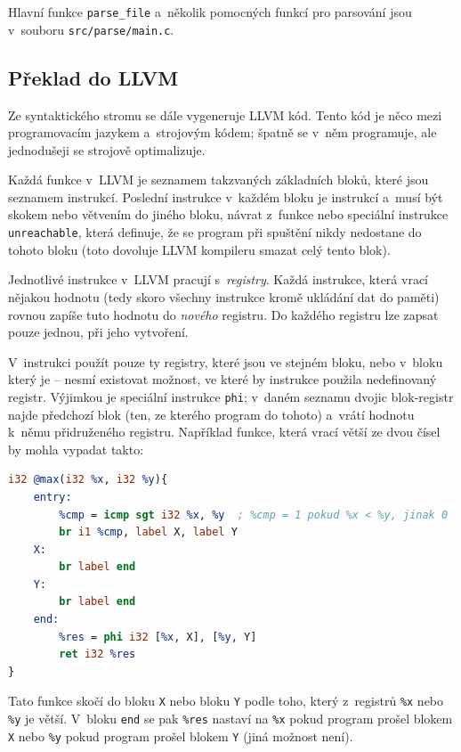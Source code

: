 \documentclass[12pt]{article}
\def\file#1{\texttt{#1}}
\def\code#1{\texttt{#1}}
\begin{document}
Hlavní funkce \code{parse\_file} a~několik pomocných funkcí pro parsování jsou v~souboru \file{src/parse/main.c}.

\subsection{Překlad do LLVM}
Ze syntaktického stromu se dále vygeneruje LLVM kód.
Tento kód je něco mezi programovacím jazykem a~strojovým kódem; špatně se v~něm programuje, ale jednodušeji se strojově optimalizuje.

Každá funkce v~LLVM je seznamem takzvaných základních bloků, které jsou seznamem instrukcí.
Poslední instrukce v~každém bloku je  instrukcí a~musí být skokem nebo větvením do jiného bloku,
návrat z~funkce nebo speciální instrukce \code{unreachable}, která definuje, že se program při spuštění nikdy
nedostane do tohoto bloku (toto dovoluje LLVM kompileru smazat celý tento blok). \cite{llvm:docs}

Jednotlivé instrukce v~LLVM pracují s~\textit{registry}.
Každá instrukce, která vrací nějakou hodnotu (tedy skoro všechny instrukce kromě ukládání dat do paměti) rovnou zapíše tuto hodnotu do \textit{nového} registru.
Do každého registru lze zapsat pouze jednou, při jeho vytvoření. \cite{llvm:docs}

V~instrukci použít pouze ty registry, které jsou ve stejném bloku, nebo v~bloku který je  -- nesmí existovat možnost, ve které by instrukce použila nedefinovaný registr.
Výjimkou je speciální instrukce \code{phi}; v~daném seznamu dvojic blok-registr najde předchozí blok (ten, ze kterého program  do tohoto) a~vrátí hodnotu k~němu přidruženého registru.
Například funkce, která vrací větší ze dvou čísel by mohla vypadat takto:

\begin{lstlisting}[language=llvm]
i32 @max(i32 %x, i32 %y){
	entry:
		%cmp = icmp sgt i32 %x, %y  ; %cmp = 1 pokud %x < %y, jinak 0
		br i1 %cmp, label X, label Y
	X:
		br label end
	Y:
		br label end
	end:
		%res = phi i32 [%x, X], [%y, Y]
		ret i32 %res
}
\end{lstlisting}

Tato funkce skočí do bloku \code{X} nebo bloku \code{Y} podle toho, který z~registrů \code{\%x} nebo \code{\%y} je větší.
V~bloku \code{end} se pak \code{\%res} nastaví na \code{\%x} pokud program prošel blokem \code{X} nebo \code{\%y} pokud program prošel blokem \code{Y} (jiná možnost není).
\end{document}

